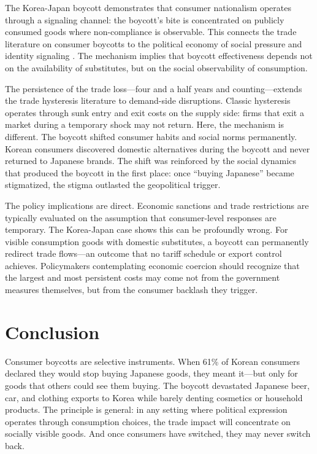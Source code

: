 \documentclass[12pt]{article}
\begin{document}
The Korea-Japan boycott demonstrates that consumer nationalism operates through a signaling channel: the boycott's bite is concentrated on publicly consumed goods where non-compliance is observable. This connects the trade literature on consumer boycotts \citep{pandya2011trade, fuchs2015understanding} to the political economy of social pressure and identity signaling \citep{dellavigna2017voting, bursztyn2020misperceptions}. The mechanism implies that boycott effectiveness depends not on the availability of substitutes, but on the social observability of consumption.

The persistence of the trade loss---four and a half years and counting---extends the trade hysteresis literature \citep{baldwin1988hysteresis, dixit1989entry} to demand-side disruptions. Classic hysteresis operates through sunk entry and exit costs on the supply side: firms that exit a market during a temporary shock may not return. Here, the mechanism is different. The boycott shifted consumer habits and social norms permanently. Korean consumers discovered domestic alternatives during the boycott and never returned to Japanese brands. The shift was reinforced by the social dynamics that produced the boycott in the first place: once ``buying Japanese'' became stigmatized, the stigma outlasted the geopolitical trigger.

The policy implications are direct. Economic sanctions and trade restrictions are typically evaluated on the assumption that consumer-level responses are temporary. The Korea-Japan case shows this can be profoundly wrong. For visible consumption goods with domestic substitutes, a boycott can permanently redirect trade flows---an outcome that no tariff schedule or export control achieves. Policymakers contemplating economic coercion should recognize that the largest and most persistent costs may come not from the government measures themselves, but from the consumer backlash they trigger.


\section{Conclusion}

Consumer boycotts are selective instruments. When 61\% of Korean consumers declared they would stop buying Japanese goods, they meant it---but only for goods that others could see them buying. The boycott devastated Japanese beer, car, and clothing exports to Korea while barely denting cosmetics or household products. The principle is general: in any setting where political expression operates through consumption choices, the trade impact will concentrate on socially visible goods. And once consumers have switched, they may never switch back.
\end{document}
